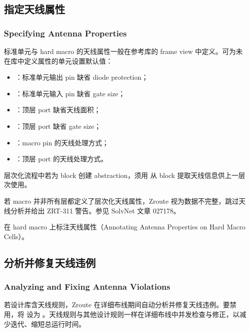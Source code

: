 \subsection{指定天线属性}
\subsubsection*{Specifying Antenna Properties}

标准单元与 hard macro 的天线属性一般在参考库的 frame view 中定义。可为未在库中定义属性的单元设置默认值：
\begin{itemize}
  \item {}：标准单元输出 pin 缺省 diode protection；
  \item {}：标准单元输入 pin 缺省 gate size；
  \item {}：顶层 port 缺省天线面积；
  \item {}：顶层 port 缺省 gate size；
  \item {}：macro pin 的天线处理方式；
  \item {}：顶层 port 的天线处理方式。
\end{itemize}

层次化流程中若为 block 创建 abstraction，须用  从 block 提取天线信息供上一层次使用。

\begin{noteBox}
若 macro 并非所有层都定义了层次化天线属性，Zroute 视为数据不完整，跳过天线分析并给出 ZRT-311 警告。参见 SolvNet 文章 027178。
\end{noteBox}

\begin{seeAlsoBox}
在 hard macro 上标注天线属性（Annotating Antenna Properties on Hard Macro Cells）。
\end{seeAlsoBox}

\subsection{分析并修复天线违例}
\subsubsection*{Analyzing and Fixing Antenna Violations}

若设计库含天线规则，Zroute 在详细布线期间自动分析并修复天线违例。要禁用，将  设为 。天线规则与其他设计规则一样在详细布线中并发检查与修正，以减少迭代、缩短总运行时间。

